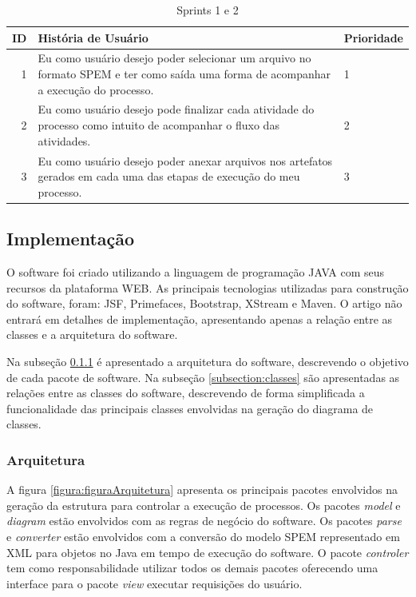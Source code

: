 \begin{table}[!htb]

	\centering
	\caption{Sprints 1 e 2}
		\label{sprint2}
	\vspace{0.5cm}
	\begin{tabular}{r|p{11cm}|p{2cm}}
		
		ID & História de Usuário & Prioridade \\ %
		\hline                               %
		1 & Eu como usuário desejo poder selecionar um arquivo no formato SPEM e ter como saída uma forma de acompanhar a execução do processo.        & 1 \\
		\hline     
		2 & Eu como usuário desejo pode finalizar cada atividade do processo como intuito de acompanhar o fluxo das atividades.  & 2 \\
		\hline 
		3 & Eu como usuário desejo poder anexar arquivos nos artefatos gerados em cada uma das etapas de execução do meu processo.           & 3 
	\end{tabular}
\end{table}

\subsection{Implementação}\label{ferramentaImplementacao}
O software foi criado utilizando a linguagem de programação JAVA com seus recursos da plataforma WEB. As principais tecnologias utilizadas para construção do software, foram: JSF, Primefaces, Bootstrap, XStream e Maven. O artigo não entrará em detalhes de implementação, apresentando apenas a relação entre as classes e a arquitetura do software.

Na subseção \ref{subsection:arquitetura} é apresentado a arquitetura do software, descrevendo o objetivo de cada pacote de software. Na subseção \ref{subsection:classes} são apresentadas as relações entre as classes do software, descrevendo de forma simplificada a funcionalidade das principais classes envolvidas na geração do diagrama de classes.

\subsubsection{Arquitetura}\label{subsection:arquitetura}
A figura \ref{figura:figuraArquitetura} apresenta os principais pacotes envolvidos na geração da estrutura para controlar a execução de processos. Os pacotes \textit{model} e \textit{diagram} estão envolvidos com as regras de negócio do software. Os pacotes \textit{parse} e \textit{converter} estão envolvidos com a conversão do modelo SPEM representado em XML para objetos no Java em tempo de execução do software.
O pacote \textit{controler} tem como responsabilidade utilizar todos os demais pacotes oferecendo uma interface para o pacote \textit{view} executar requisições do usuário. 

